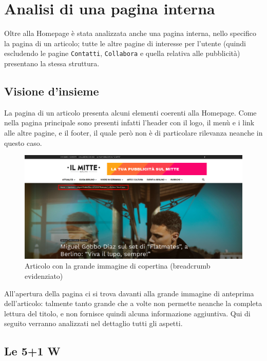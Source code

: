 \newpage
\section{Analisi di una pagina interna}
Oltre alla Homepage è stata analizzata anche una pagina interna, nello specifico la pagina di un articolo; tutte le altre pagine di interesse per l'utente (quindi escludendo le pagine \texttt{Contatti}, \texttt{Collabora} e quella relativa alle pubblicità) presentano la stessa struttura.

\subsection{Visione d'insieme}
La pagina di un articolo presenta alcuni elementi coerenti alla Homepage. Come nella pagina principale sono presenti infatti l'header con il logo, il menù e i link alle altre pagine, e il footer, il quale però non è di particolare rilevanza neanche in questo caso. \\

\vspace{30pt}
\begin{figure}[htbp]
\begin{center}
\includegraphics[width=35em]{img/articolo}
\caption{Articolo con la grande immagine di copertina (breadcrumb evidenziato)}
\end{center}
\end{figure}
\vspace{30pt}

All'apertura della pagina ci si trova davanti alla grande immagine di anteprima dell'articolo: talmente tanto grande che a volte non permette neanche la completa lettura del titolo, e non fornisce quindi alcuna informazione aggiuntiva. Qui di seguito verranno analizzati nel dettaglio tutti gli aspetti.

\subsection{Le 5+1 W}

